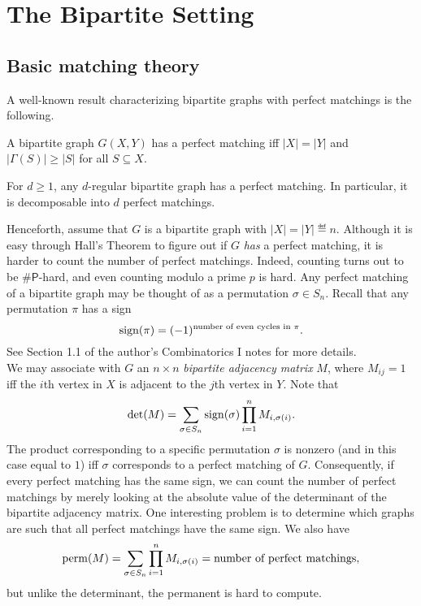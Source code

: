 
\section{The Bipartite Setting}


\subsection{Basic matching theory}

A well-known result characterizing bipartite graphs with perfect matchings is the following.

\begin{ftheo}
	A bipartite graph $G(X,Y)$ has a perfect matching iff $|X|=|Y|$ and $|\Gamma(S)| \ge |S|$ for all $S \subseteq X$.
\end{ftheo}

\begin{fcor}
	For $d \ge 1$, any $d$-regular bipartite graph has a perfect matching. In particular, it is decomposable into $d$ perfect matchings.
\end{fcor}

Henceforth, assume that $G$ is a bipartite graph with $|X|=|Y|\eqdef n$. Although it is easy through Hall's Theorem to figure out if $G$ \emph{has} a perfect matching, it is harder to count the number of perfect matchings. Indeed, counting turns out to be $\#\mathsf{P}$-hard, and even counting modulo a prime $p$ is hard. Any perfect matching of a bipartite graph may be thought of as a permutation $\sigma \in S_n$. Recall that any permutation $\pi$ has a sign
\[ \operatorname{sign}(\pi) = (-1)^{\text{number of even cycles in $\pi$}}. \]
See Section 1.1 of the author's Combinatorics I notes for more details.\\

We may associate with $G$ an $n \times n$ \emph{bipartite adjacency matrix} $M$, where $M_{ij} = 1$ iff the $i$th vertex in $X$ is adjacent to the $j$th vertex in $Y$. Note that
\[ \det(M) = \sum_{\sigma \in S_n} \operatorname{sign}(\sigma) \prod_{i=1}^n M_{i,\sigma(i)}. \]
The product corresponding to a specific permutation $\sigma$ is nonzero (and in this case equal to $1$) iff $\sigma$ corresponds to a perfect matching of $G$. Consequently, if every perfect matching has the same sign, we can count the number of perfect matchings by merely looking at the absolute value of the determinant of the bipartite adjacency matrix. One interesting problem is to determine which graphs are such that all perfect matchings have the same sign. We also have
\[ \operatorname{perm}(M) = \sum_{\sigma \in S_n} \prod_{i=1}^n M_{i,\sigma(i)} = \text{number of perfect matchings}, \]
but unlike the determinant, the permanent is hard to compute.\\

